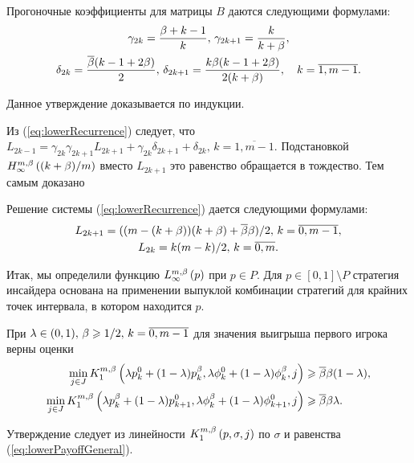 \begin{proposition}
  \label{proposition:tridiagonal:coefficients}
  Прогоночные коэффициенты для матрицы $B$ даются следующими
  формулами\textup{:}
  \begin{multline*}
    \gamma_{2k} = \frac{\beta+k-1}{k}, \,
    \gamma_{2k+1} = \frac{k}{k+\beta}, \\
    \delta_{2k} = \frac{\overline{\beta}(k-1+2\beta)}{2}, \, \delta_{2k+1} =
    \frac{k\beta(k-1+2\beta)}{2(k+\beta)}, \quad k = \overline{1,m-1}.
  \end{multline*}
\end{proposition}
Данное утверждение доказывается по индукции.

Из (\ref{eq:lowerRecurrence}) следует, что $L_{2k-1} =
\gamma_{2k}\gamma_{2k+1}L_{2k+1} + \gamma_{2k}\delta_{2k+1} +
\delta_{2k}, \, k = \overline{1, m-1}$. Подстановкой
$H_{\infty}^{m,\beta}\left({(k+\beta)/m}\right)$ вместо $L_{2k+1}$ это равенство обращается в
тождество. Тем самым доказано

\begin{proposition}
  \label{proposition:lower:recurrence-solution}
  Решение системы {\normalfont(\ref{eq:lowerRecurrence})} дается
  следующими формулами\textup{:}
  \begin{gather*}
    L_{2k+1} = ((m - (k + \beta))(k + \beta) + \overline{\beta}\beta)/2, \, k = \overline{0, m-1},\\
    L_{2k} = k (m-k)/2, \, k = \overline{0,m}.
  \end{gather*}
\end{proposition}

Итак, мы определили функцию $L_{\infty}^{m,\beta}\left({p}\right)$ при $p \in P$. Для $p \in
[0, 1] \setminus P$ стратегия инсайдера основана на применении выпуклой
комбинации стратегий для крайних точек интервала, в котором находится
$p$.

\begin{proposition}
  \label{proposition:first:combination:step}
  При $\lambda \in (0, 1), \, \beta \geqslant 1/2, \, k = \overline{0, m-1}$
  для значения выигрыша первого игрока верны оценки
  \begin{align*}
    \min_{j \in J}
    \firstPlayerPayoff{1}{%
    \lambda \pEven + (1-\lambda) \pOdd}{%
    \lambda \fEven + (1-\lambda) \fOdd}{%
    j}
    &\geq \DCo \Co (1-\lambda), \\
    \min_{j \in J}
    \firstPlayerPayoff{1}{%
    \lambda \pOdd + (1-\lambda) \pEven[k+1]}{%
    \lambda \fOdd + (1-\lambda) \fEven[k+1]}{%
    j}
    &\geq \DCo \Co \lambda.
  \end{align*}
\end{proposition}
Утверждение следует из линейности $K_{1}^{m,\beta}\left({p}, {\sigma}, {j}\right)$
по $\sigma$ и равенства (\ref{eq:lowerPayoffGeneral}).

